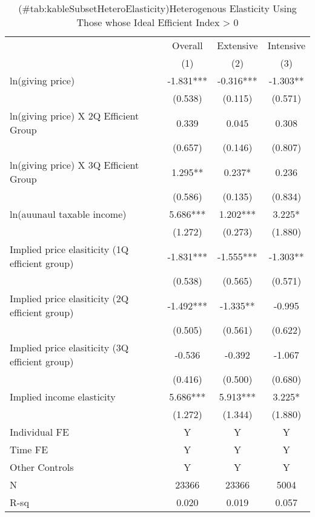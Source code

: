 \documentclass[
]{article}
\begin{document}
\begin{table}

\caption{(\#tab:kableSubsetHeteroElasticity)Heterogenous Elasticity Using Those whose Ideal Efficient Index > 0}
\centering
\fontsize{8}{10}\selectfont
\begin{threeparttable}
\begin{tabular}[t]{lccc}
\toprule
\multicolumn{1}{c}{ } & \multicolumn{1}{c}{Overall} & \multicolumn{1}{c}{Extensive} & \multicolumn{1}{c}{Intensive} \\
\cmidrule(l{3pt}r{3pt}){2-2} \cmidrule(l{3pt}r{3pt}){3-3} \cmidrule(l{3pt}r{3pt}){4-4}
 & (1) & (2) & (3)\\
\midrule
ln(giving price) & -1.831*** & -0.316*** & -1.303**\\
 & (0.538) & (0.115) & (0.571)\\
ln(giving price) X 2Q Efficient Group & 0.339 & 0.045 & 0.308\\
 & (0.657) & (0.146) & (0.807)\\
ln(giving price) X 3Q Efficient Group & 1.295** & 0.237* & 0.236\\
 & (0.586) & (0.135) & (0.834)\\
ln(auunaul taxable income) & 5.686*** & 1.202*** & 3.225*\\
 & (1.272) & (0.273) & (1.880)\\
Implied price elasiticity (1Q efficient group) & -1.831*** & -1.555*** & -1.303**\\
 & (0.538) & (0.565) & (0.571)\\
Implied price elasiticity (2Q efficient group) & -1.492*** & -1.335** & -0.995\\
 & (0.505) & (0.561) & (0.622)\\
Implied price elasiticity (3Q efficient group) & -0.536 & -0.392 & -1.067\\
 & (0.416) & (0.500) & (0.680)\\
Implied income elasticity & 5.686*** & 5.913*** & 3.225*\\
 & (1.272) & (1.344) & (1.880)\\
Individual FE & Y & Y & Y\\
Time FE & Y & Y & Y\\
Other Controls & Y & Y & Y\\
N & 23366 & 23366 & 5004\\
R-sq & 0.020 & 0.019 & 0.057\\
\bottomrule
\end{tabular}
\begin{tablenotes}

\end{tablenotes}
\end{threeparttable}
\end{table}
\end{document}
